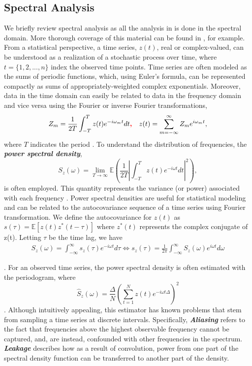 \documentclass{stat572Style}
\newcommand{\vmadd}[1]{\textbf{\color{red}{#1}}}
\begin{document}
	\subsection{Spectral Analysis}
	\label{sec: specAnalysis}
	\indent We briefly review spectral analysis as all the analysis in \citet{Sykulski2016} is done in the spectral domain.   
	More thorough coverage of this material can be found in  \citep{Percival1993}, for example. 
	From a statistical perspective, a time series, $z(t)$, real or complex-valued,  can be understood as a realization of a stochastic process over time, where  $t = \{1,2,...,n\}$ index the observed time points.  
	Time series are often modeled as the sums of periodic functions, which, using Euler's formula, can be represented compactly as sums of appropriately-weighted complex exponentials. 
	Moreover, data in the time domain can easily be related to data in the frequency domain and vice versa using the Fourier or inverse Fourier transformations,
	\begin{align}
Z_{m} = \frac{1}{2T} \int_{-T}^{T}z(t)e^{-i\omega_{m}t} dt\vmadd{,} && z(t) = \sum_{m=-\infty}^{\infty}Z_{m}e^{i \omega_{m} t},
\end{align}
where $T$ indicates the period \citep{Percival1993}. 
To understand the distribution of frequencies, the \textbf{\it{power spectral density}},
\begin{equation}
S_{z}(\omega) = \underset{T \rightarrow \infty}{\lim} \mathbb{E} \left(\frac{1}{2T} \left| \int_{-T}^{T} z(t) e^{-i \omega t}dt \right|^{2} \right),
\end{equation}
is often employed. 
This quantity represents the variance (or power) associated with each frequency \citep{Percival1993}. 
Power spectral densities are useful for statistical modeling and can be related to the autocovariance sequence of a time series using  Fourier transformation.  
We define the autocovariance  for $z(t)$ as $s(\tau) = \mathbb{E}[z(t) z^{*}(t - \tau)] $\vmadd{,} where $z^{*}(t)$ represents the complex conjugate of z(t). Letting $\tau$ be the time lag, we have
\begin{align}
\label{eq: fourierPair}
S_{z}(\omega) = \int_{-\infty}^{\infty}s_{z}(\tau) e^{-i\omega t}d \tau \Longleftrightarrow s_{z}(\tau) = \frac{1}{2\pi} \int_{-\infty}^{\infty}S_{z}(\omega) e^{i \omega t} d\omega 
\end{align}

\noindent \citep{Percival1993}. For an observed time series, the power spectral density is often estimated with the periodogram, where 
\begin{equation}
\label{eq: perio}
\hat{S}_{z}(\omega) = \frac{\Delta}{N} \left( \sum_{t=1}^{N} z(t) e^{-i \omega t \Delta} \right)^{2}
\end{equation}
\citep{Sykulski2013}. 
Although intuitively appealing, this estimator has known problems that stem from  sampling a time series at discrete intervals. 
Specifically, \textbf{\it{Aliasing}} refers to the fact that frequencies above the highest observable frequency cannot be captured, and, are instead, confounded with other frequencies in the spectrum.  
\textbf{\it{Leakage}} describes how as a result of convolution, power from one part of the spectral density function can be transferred to another part of the density. 
\end{document}
